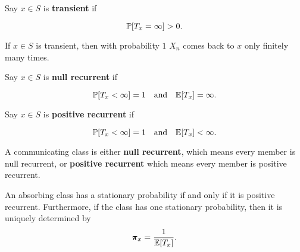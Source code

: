 \begin{definition}[Transience]
    Say $x \in S$ is \textbf{transient} if 
    
    \begin{equation*}
        \mathbb{P}[T_x = \infty] > 0.
    \end{equation*}
\end{definition}

\begin{remark}
    If $x \in S$ is transient, then with probability $1$ $X_n$ comes back to $x$ only finitely many times.
\end{remark}

\begin{definition}
    Say $x \in S$ is \textbf{null recurrent} if 

    \begin{equation*}
        \mathbb{P}[T_x < \infty] = 1 \quad \text{and} \quad \mathbb{E}[T_x] = \infty.
    \end{equation*}
\end{definition}

\begin{definition}
    Say $x \in S$ is \textbf{positive recurrent} if 

    \begin{equation*}
        \mathbb{P}[T_x < \infty] = 1 \quad \text{and} \quad \mathbb{E}[T_x] < \infty.
    \end{equation*}
\end{definition}

\begin{remark}
    A communicating class is either \textbf{null recurrent}, which means every member is null recurrent, or \textbf{positive recurrent} which means every member is positive recurrent. 
\end{remark}

\begin{theorem}
    An absorbing class has a stationary probability if and only if it is positive recurrent. Furthermore, if the class has one stationary probability, then it is uniquely determined by 
    \begin{equation*}
        \pmb{\pi}_x = \frac{1}{\mathbb{E}[T_x]}.
    \end{equation*}
\end{theorem}